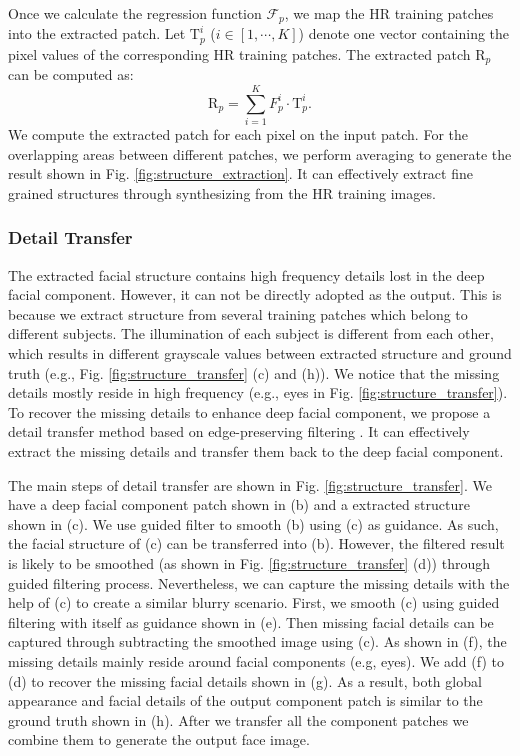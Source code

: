 \documentclass{article}
\begin{document}
Once we calculate the regression function $\mathcal{F}_p$, we map the HR training patches into the extracted patch. Let $\textrm{T}_p^i$ ($i\in[1,\cdots,K]$) denote one vector containing the pixel values of the corresponding HR training patches. The extracted patch $\textrm{R}_p$ can be computed as:
\begin{equation}
\textrm{R}_p=\sum_{i=1}^K{F_p^i\cdot\textrm{T}_p^i}.
\label{eq:mapping}
\end{equation}
We compute the extracted patch for each pixel on the input patch. For the overlapping areas between different patches, we perform averaging to generate the result shown in Fig. \ref{fig:structure_extraction}. It can effectively extract fine grained structures through synthesizing from the HR training images.


\subsubsection{Detail Transfer}
The extracted facial structure contains high frequency details lost in the deep facial component. However, it can not be directly adopted as the output. This is because we extract structure from several training patches which belong to different subjects. The illumination of each subject is different from each other, which results in different grayscale values between extracted structure and ground truth (e.g., Fig. \ref{fig:structure_transfer} (c) and (h)). We notice that the missing details mostly reside in high frequency (e.g., eyes in Fig. \ref{fig:structure_transfer}). To recover the missing details to enhance deep facial component, we propose a detail transfer method based on edge-preserving filtering \cite{Petschnigg-siggraph04-JBF,Eisemann-siggraph04-JBF}. It can effectively extract the missing details and transfer them back to the deep facial component.

The main steps of detail transfer are shown in Fig. \ref{fig:structure_transfer}. We have a deep facial component patch shown in (b) and a extracted structure shown in (c). We use guided filter \cite{kaiming-pami2013-GuidedFilter} to smooth (b) using (c) as guidance. As such, the facial structure of (c) can be transferred into (b). However, the filtered result is likely to be smoothed (as shown in Fig. \ref{fig:structure_transfer} (d)) through guided filtering process. Nevertheless, we can capture the missing details with the help of (c) to create a similar blurry scenario. First, we smooth (c) using guided filtering with itself as guidance shown in (e). Then missing facial details can be captured through subtracting the smoothed image using (c). As shown in (f), the missing details mainly reside around facial components (e.g, eyes). We add (f) to (d) to recover the missing facial details shown in (g). As a result, both global appearance and facial details of the output component patch is similar to the ground truth shown in (h). After we transfer all the component patches we combine them to generate the output face image.
\end{document}
